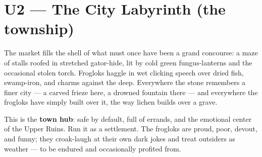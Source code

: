 \documentclass[10pt,twoside]{report}
\begin{document}
\section{U2 --- The City Labyrinth (the township)}
\begin{readaloud}
The market fills the shell of what must once have been a grand concourse: a maze of stalls roofed in stretched gator-hide, lit by cold green fungus-lanterns and the occasional stolen torch. Frogloks haggle in wet clicking speech over dried fish, swamp-iron, and charms against the deep. Everywhere the stone remembers a finer city --- a carved frieze here, a drowned fountain there --- and everywhere the frogloks have simply built over it, the way lichen builds over a grave.
\end{readaloud}

This is the \textbf{town hub}: safe by default, full of errands, and the emotional center of the Upper Ruins. Run it as a settlement. The frogloks are proud, poor, devout, and funny; they croak-laugh at their own dark jokes and treat outsiders as weather --- to be endured and occasionally profited from.
\end{document}

